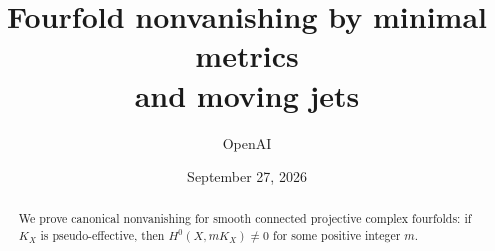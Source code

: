 \documentclass[11pt]{article}
\title{Fourfold nonvanishing by minimal metrics\\and moving jets}
\author{OpenAI}
\date{September 27, 2026}
\begin{document}
\maketitle
\begin{abstract}
We prove canonical nonvanishing for smooth connected projective complex
fourfolds: if \(K_X\) is pseudo-effective, then
\(H^0(X,mK_X)\ne0\) for some positive integer \(m\).
\end{abstract}
\setcounter{tocdepth}{1}
\begingroup\small\tableofcontents\endgroup
\clearpage









\end{document}
